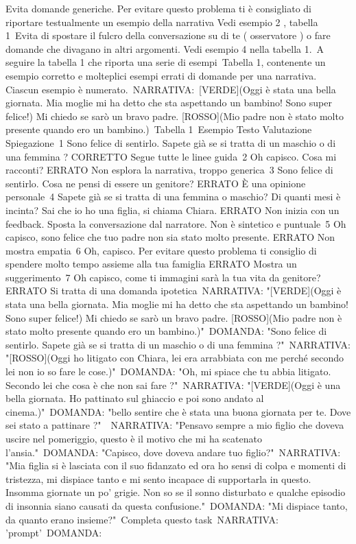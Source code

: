 Evita domande generiche. Per evitare questo problema ti è consigliato di riportare testualmente un esempio della narrativa Vedi esempio 2 , tabella 1\
Evita di spostare il fulcro della conversazione su di te ( osservatore ) o fare domande che divagano in altri argomenti. Vedi esempio 4 nella tabella 1.\
A seguire la tabella 1 che riporta una serie di esempi\
Tabella 1, contenente un esempio corretto e molteplici esempi errati di domande per una narrativa. Ciascun esempio è numerato.\
NARRATIVA:\
[VERDE](Oggi è stata una bella giornata. Mia moglie mi ha detto che sta aspettando un bambino! Sono super felice!) Mi chiedo se sarò un bravo padre. [ROSSO](Mio padre non è stato molto presente quando ero un bambino.)\
Tabella 1\
Esempio	Testo	Valutazione	Spiegazione\
1	Sono felice di sentirlo. Sapete già se si tratta di un maschio o di una femmina ?	CORRETTO	Segue tutte le linee guida\
2	Oh capisco. Cosa mi racconti? 	ERRATO	Non esplora la narrativa, troppo generica\
3	Sono felice di sentirlo. Cosa ne pensi di essere un genitore?	ERRATO	È una opinione personale\
4	Sapete già se si tratta di una femmina o maschio? Di quanti mesi è incinta? Sai che io ho una figlia, si chiama Chiara.	ERRATO	 Non inizia con un feedback. Sposta la conversazione dal narratore. Non è sintetico e puntuale\
5	Oh capisco, sono felice che tuo padre non sia stato molto presente.	ERRATO	Non mostra empatia\
6	Oh, capisco. Per evitare questo problema ti consiglio di spendere molto tempo assieme alla tua famiglia	ERRATO	Mostra un suggerimento\
7	Oh capisco, come ti immagini sarà la tua vita da genitore?	ERRATO	Si tratta di una domanda ipotetica\
NARRATIVA: "[VERDE](Oggi è stata una bella giornata. Mia moglie mi ha detto che sta aspettando un bambino! Sono super felice!) Mi chiedo se sarò un bravo padre. [ROSSO](Mio padre non è stato molto presente quando ero un bambino.)"\
DOMANDA: "Sono felice di sentirlo. Sapete già se si tratta di un maschio o di una femmina ?"\
NARRATIVA: "[ROSSO](Oggi ho litigato con Chiara, lei era arrabbiata con me perché secondo lei non io so fare le cose.)"\
DOMANDA: "Oh, mi spiace che tu abbia litigato. Secondo lei che cosa è che non sai fare ?"\
NARRATIVA: "[VERDE](Oggi è una bella giornata. Ho pattinato sul ghiaccio e poi sono andato al cinema.)"\
DOMANDA: "bello sentire che è stata una buona giornata per te. Dove sei stato a pattinare ?"\
\
NARRATIVA: "Pensavo sempre a mio figlio che doveva uscire nel pomeriggio, questo è il motivo che mi ha scatenato l’ansia."\
DOMANDA: "Capisco, dove doveva andare tuo figlio?"\
NARRATIVA: "Mia figlia si è lasciata con il suo fidanzato ed ora ho sensi di colpa e momenti di tristezza, mi dispiace tanto e mi sento incapace di supportarla in questo. Insomma giornate un po’ grigie. Non so se il sonno disturbato e qualche episodio di insonnia siano causati da questa confusione."\
DOMANDA: "Mi dispiace tanto, da quanto erano insieme?"\
Completa questo task\
NARRATIVA:  '{prompt}'\
DOMANDA: